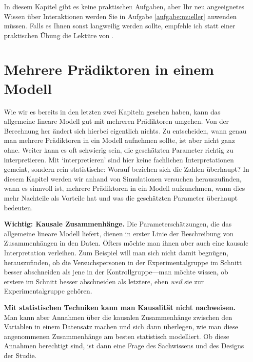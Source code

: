 \documentclass[oneside, 10pt]{book}\usepackage[]{graphicx}\usepackage[]{xcolor}
\begin{document}
\bigskip

In diesem Kapitel gibt es keine praktischen Aufgaben,
aber Ihr neu angeeignetes Wissen über Interaktionen werden Sie in
Aufgabe \vref{aufgabe:mueller} anwenden müssen.
Falls es Ihnen sonst langweilig werden sollte, empfehle ich statt
einer praktischen Übung die Lektüre von \citet{Wagenmakers2012}.


\chapter{Mehrere Prädiktoren in einem Modell}\label{ch:multimod}
Wie wir es bereits in den letzten zwei Kapiteln
gesehen haben, kann das allgemeine lineare Modell
gut mit mehreren Prädiktoren umgehen. Von der
Berechnung her ändert sich hierbei eigentlich nichts.
Zu entscheiden, wann genau man mehrere Prädiktoren
in ein Modell aufnehmen sollte, ist aber nicht ganz ohne.
Weiter kann es oft schwierig sein, die geschätzten
Parameter richtig zu interpretieren.
Mit `interpretieren' sind hier keine fachlichen Interpretationen gemeint,
sondern rein statistische: Worauf beziehen sich die Zahlen
überhaupt?
In diesem Kapitel werden wir anhand von Simulationen
versuchen herauszufinden, wann es sinnvoll ist, mehrere
Prädiktoren in ein Modell aufzunehmen, wann dies mehr Nachteile
als Vorteile hat und was die geschätzten Parameter
überhaupt bedeuten.

\medskip

\begin{framed}
\noindent \textbf{Wichtig: Kausale Zusammenhänge.}
Die Parameterschätzungen, die das allgemeine lineare Modell liefert,
dienen in erster Linie der Beschreibung von Zusammenhängen in den Daten.
Öfters möchte man ihnen aber auch eine kausale Interpretation verleihen.
Zum Beispiel will man sich nicht damit begnügen, herauszufinden,
ob die Versuchspersonen in der Experimentalgruppe im Schnitt besser
abschneiden als jene in der Kontrollgruppe---man möchte wissen,
ob erstere im Schnitt besser abschneiden als letztere, eben \emph{weil}
sie zur Experimentalgruppe gehören.

{\bf Mit statistischen Techniken kann man Kausalität nicht nachweisen.}
Man kann aber Annahmen über die kausalen Zusammenhänge zwischen
den Variablen in einem Datensatz machen und sich dann überlegen,
wie man diese angenommenen Zusammenhänge am besten statistisch 
modelliert. Ob diese Annahmen berechtigt sind, ist dann 
eine Frage des Sachwissens und des Designs der Studie.
\end{framed}
\end{document}
